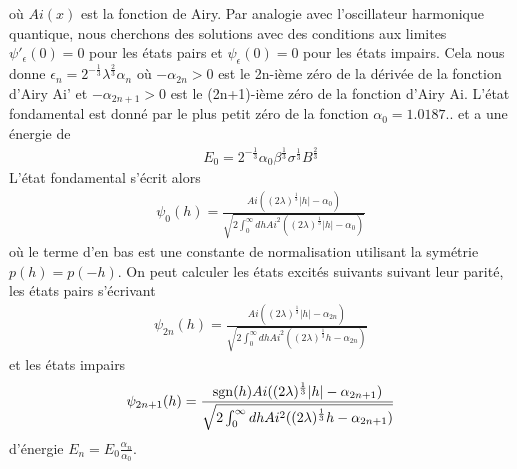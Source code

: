 où $Ai(x)$ est la fonction de Airy. Par analogie avec l'oscillateur harmonique quantique, nous cherchons des solutions avec des conditions aux limites $\psi'_\epsilon(0) = 0$ pour les états pairs et $\psi_\epsilon(0) = 0$ pour les états impairs. Cela nous donne $\epsilon_n = 2^{-\frac{1}{3}} \lambda^\frac{2}{3}\alpha_n$ où $-\alpha_{2n} \greater 0$ est le 2n-ième zéro de la dérivée de la fonction d'Airy Ai' et $-\alpha_{2n+1} \greater 0$ est le (2n+1)-ième zéro de la fonction d'Airy Ai. L'état fondamental est donné par le plus petit zéro de la fonction $\alpha_0 = 1.0187..$ et a une énergie de 
\begin{align}
	E_0 = 2^{-\frac{1}{3}} \alpha_0 \beta^\frac{1}{3}\sigma^{\frac{1}{3}}B^\frac{2}{3}
\end{align}
L'état fondamental s'écrit alors
\begin{align}
	\psi_0(h) = \frac{ Ai ( (2\lambda)^\frac{1}{3} |h|-\alpha_0 )}{ \sqrt{2 \int_0^\infty dh Ai^2 ( (2\lambda)^\frac{1}{3} |h|-\alpha_0 ) }}
\end{align}
où le terme d'en bas est une constante de normalisation utilisant la symétrie $p(h)=p(-h)$.  
On peut calculer les états excités suivants suivant leur parité, les états pairs s'écrivant
\begin{align}
	\psi_{2n}(h) = \frac{ Ai ( (2\lambda)^\frac{1}{3} |h|-\alpha_{2n} )}{ \sqrt{2 \int_0^\infty dh Ai^2 ( (2\lambda)^\frac{1}{3} h-\alpha_{2n} ) }}
\end{align}
et les états impairs
\begin{align}
	\psi_{2n+1}(h) = \frac{ \operatorname{sgn}(h) Ai ( (2\lambda)^\frac{1}{3} |h|-\alpha_{2n+1} )}{ \sqrt{2 \int_0^\infty dh Ai^2 ( (2\lambda)^\frac{1}{3} h-\alpha_{2n+1} ) }}
\end{align}
d'énergie $E_{n} = E_0 \frac{\alpha_{n}}{\alpha_0}$. 

